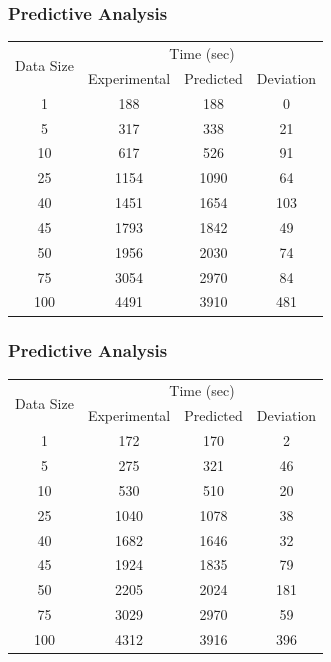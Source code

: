 \documentclass[12pt,xcolor=dvipsnames]{beamer}
\begin{document}
\begin{frame}[t]
\frametitle{Predictive Analysis}
\begin{center}
\begin{tabular}{|c|c|c|c|}\hline
\multirow{2}{*}{Data Size} & \multicolumn{3}{c|}{Time (sec)}\\
\cline{2-4}
& Experimental & Predicted & Deviation\\\hline
1 & 188 & 188 & 0\\
5 & 317 & 338 & 21\\
10 & 617 & 526 & 91\\
25 & 1154 & 1090 & 64\\
40 & 1451 & 1654 & 103\\
45 & 1793 & 1842 & 49\\
50 & 1956 & 2030 & 74\\
75 & 3054 & 2970 & 84\\
100 & 4491 & 3910 & 481\\\hline
\end{tabular}
\end{center}
\end{frame}

\begin{frame}[t]
 \frametitle{Predictive Analysis}
\begin{center}
\begin{tabular}{|c|c|c|c|}\hline
\multirow{2}{*}{Data Size} & \multicolumn{3}{c|}{Time (sec)}\\
\cline{2-4}
& Experimental & Predicted & Deviation\\\hline
1 & 172 & 170 & 2\\
5 & 275 & 321 & 46\\
10 & 530 & 510 & 20\\
25 & 1040 & 1078 & 38\\
40 & 1682 & 1646 & 32\\
45 & 1924 & 1835 & 79\\
50 & 2205 & 2024 & 181\\
75 & 3029 & 2970 & 59\\
100 & 4312 & 3916 & 396\\\hline
\end{tabular}
\end{center}
\end{frame}
\end{document}
